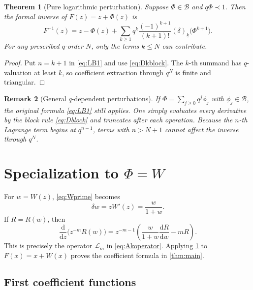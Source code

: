 \documentclass[11pt]{article}
\theoremstyle{clean}
\newtheorem{theorem}{Theorem}[section]
\newtheorem{remark}[theorem]{Remark}
\newcommand{\fall}[2]{\left(#1\right)_{\!\underline{#2}}}
\begin{document}
\begin{theorem}[Pure logarithmic perturbation]\label{thm:purelogreverse}
Suppose \(\Phi\in\mathcal B\) and \(q\Phi\prec1\).  Then the formal inverse of
\(F(z)=z+\Phi(z)\) is
\begin{equation}\label{eq:purelogformula}
  F^{-1}(z)=z-\Phi(z)
  +\sum_{k\ge1}q^k\frac{(-1)^{k+1}}{(k+1)!}
  \fall{\delta}{k}\bigl(\Phi^{k+1}\bigr).
\end{equation}
For any prescribed \(q\)-order \(N\), only the terms \(k\le N\) can
contribute.
\end{theorem}

\begin{proof}
Put \(n=k+1\) in \cref{eq:LB1} and use \cref{eq:Dkblock}.  The \(k\)-th
summand has \(q\)-valuation at least \(k\), so coefficient extraction through
\(q^N\) is finite and triangular.
\end{proof}

\begin{remark}[General \(q\)-dependent perturbations]\label{rem:qdependent}
If
\(
\Phi=\sum_{j\ge0}q^j\phi_j
\)
with \(\phi_j\in\mathcal B\), the original formula \cref{eq:LB1} still
applies.  One simply evaluates every derivative by the block rule
\cref{eq:Dblock} and truncates after each operation.  Because the \(n\)-th
Lagrange term begins at \(q^{n-1}\), terms with \(n>N+1\) cannot affect the
inverse through \(q^N\).
\end{remark}

\section{Specialization to \texorpdfstring{\(\Phi=W\)}{Phi = W}}

For \(w=W(z)\), \cref{eq:Wprime} becomes
\begin{equation}\label{eq:deltaw}
  \delta w=zW'(z)=\frac{w}{1+w}.
\end{equation}
If \(R=R(w)\), then
\begin{equation}\label{eq:DzR}
  \frac{\mathrm d}{\mathrm dz}\bigl(z^{-m}R(w)\bigr)
  =z^{-m-1}\left(
    \frac{w}{1+w}\frac{\mathrm dR}{\mathrm dw}-mR
  \right).
\end{equation}
This is precisely the operator \(\mathcal L_m\) in \cref{eq:Akoperator}.
Applying \cref{thm:purelogreverse} to \(F(x)=x+W(x)\) proves the coefficient
formula in \cref{thm:main}.

\subsection{First coefficient functions}
\end{document}
